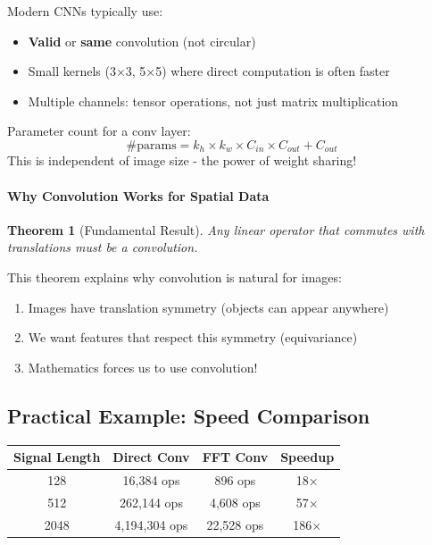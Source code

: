 \documentclass{article}
\newtheorem{theorem}{Theorem}
\begin{document}
Modern CNNs typically use:
\begin{itemize}
    \item \textbf{Valid} or \textbf{same} convolution (not circular)
    \item Small kernels (3×3, 5×5) where direct computation is often faster
    \item Multiple channels: tensor operations, not just matrix multiplication
\end{itemize}

Parameter count for a conv layer:
\[
\text{\# params} = k_h \times k_w \times C_{in} \times C_{out} + C_{out}
\]
This is independent of image size - the power of weight sharing!

\paragraph{Why Convolution Works for Spatial Data}

\begin{theorem}[Fundamental Result]
Any linear operator that commutes with translations must be a convolution.
\end{theorem}

This theorem explains why convolution is natural for images:
\begin{enumerate}
    \item Images have translation symmetry (objects can appear anywhere)
    \item We want features that respect this symmetry (equivariance)
    \item Mathematics forces us to use convolution!
\end{enumerate}

\subsection{Practical Example: Speed Comparison}

\begin{center}
\begin{tabular}{|c|c|c|c|}
\hline
Signal Length & Direct Conv & FFT Conv & Speedup \\
\hline
128 & 16,384 ops & 896 ops & 18× \\
512 & 262,144 ops & 4,608 ops & 57× \\
2048 & 4,194,304 ops & 22,528 ops & 186× \\
\hline
\end{tabular}
\end{center}
\end{document}
